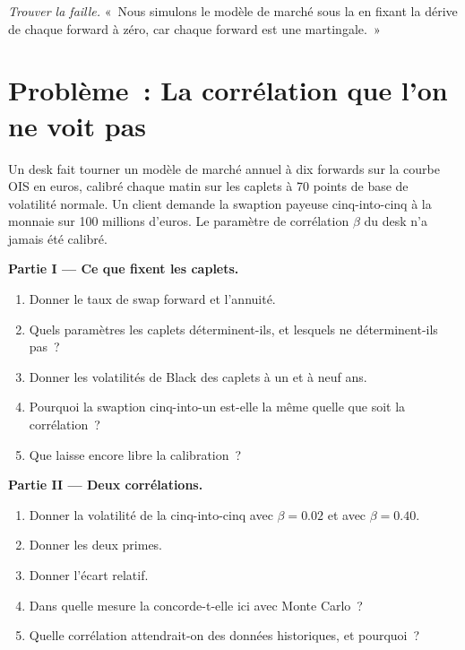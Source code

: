 \begin{exercise}[$\star\star\star$]\label{exo:rc:forward-rate-and-market-models:8}
\emph{Trouver la faille.} «~Nous simulons le modèle de marché sous la  en fixant la dérive
de chaque forward à zéro, car chaque forward est une martingale.~»
\end{exercise}

\section{Problème~: La corrélation que l'on ne voit pas}

\begin{problem}\label{pb:rc:forward-rate-and-market-models:1}
Un desk fait tourner un modèle de marché annuel à dix forwards sur la courbe OIS en euros, calibré
chaque matin sur les caplets à 70 points de base de volatilité normale. Un client
demande la swaption payeuse cinq-into-cinq à la monnaie sur 100 millions d'euros. Le
paramètre de corrélation $\beta$ du desk n'a jamais été calibré.

\medskip\noindent\textbf{Partie I --- Ce que fixent les caplets.}
\begin{enumerate}
\item Donner le taux de swap forward et l'annuité.
\item Quels paramètres les caplets déterminent-ils, et lesquels ne déterminent-ils pas~?
\item Donner les volatilités de Black des caplets à un et à neuf ans.
\item Pourquoi la swaption cinq-into-un est-elle la même quelle que soit la corrélation~?
\item Que laisse encore libre la calibration~?
\end{enumerate}

\medskip\noindent\textbf{Partie II --- Deux corrélations.}
\begin{enumerate}[resume]
\item Donner la volatilité de la cinq-into-cinq avec $\beta = 0.02$ et avec $\beta=0.40$.
\item Donner les deux primes.
\item Donner l'écart relatif.
\item Dans quelle mesure la  concorde-t-elle ici avec Monte Carlo~?
\item Quelle corrélation attendrait-on des données historiques, et pourquoi~?
\end{enumerate}


\end{problem}

